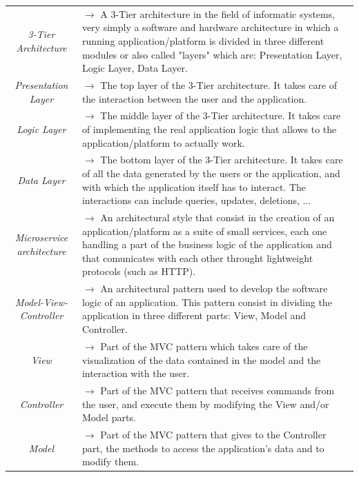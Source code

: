 \documentclass{article}
\begin{document}
{\begin{xltabular}{\textwidth}{ >{\raggedright\arraybackslash}c >{\raggedright\arraybackslash}X }
                \textit{3-Tier Architecture} & $\rightarrow$ A 3-Tier architecture in the field of informatic systems, very simply
                a software and hardware architecture in which a running application/platform is divided in three different modules
                or also called "layers" which are: Presentation Layer, Logic Layer, Data Layer. \\
                \textit{Presentation Layer} & $\rightarrow$ The top layer of the 3-Tier architecture. It takes care of the interaction
                between the user and the application.\\
                \textit{Logic Layer} & $\rightarrow$ The middle layer of the 3-Tier architecture. It takes care of implementing the real
                application logic that allows to the application/platform to actually work. \\
                \textit{Data Layer} & $\rightarrow$ The bottom layer of the 3-Tier architecture. It takes care of all the data generated 
                by the users or the application, and with which the application itself has to interact. The interactions
                can include queries, updates, deletions, ... \\
                \textit{Microservice architecture} & $\rightarrow$ An architectural style that consist in the creation of an 
                application/platform as a suite of small services, each one handling a part of the business logic of the application
                and that comunicates with each other throught lightweight protocols (such as HTTP). \\
                \textit{Model-View-Controller} & $\rightarrow$ An architectural pattern used to develop the 
                software logic of an application. This pattern consist in dividing the application in three
                different parts: View, Model and Controller. \\
                \textit{View} & $\rightarrow$ Part of the MVC pattern which takes care of the visualization of the
                data contained in the model and the interaction with the user. \\
                \textit{Controller} & $\rightarrow$ Part of the MVC pattern that receives commands from the user, and execute them
                by modifying the View and/or Model parts. \\
                \textit{Model} & $\rightarrow$ Part of the MVC pattern that gives to the Controller part, the
                methods to access the application's data and to modify them.
            \end{xltabular}

}
\end{document}
